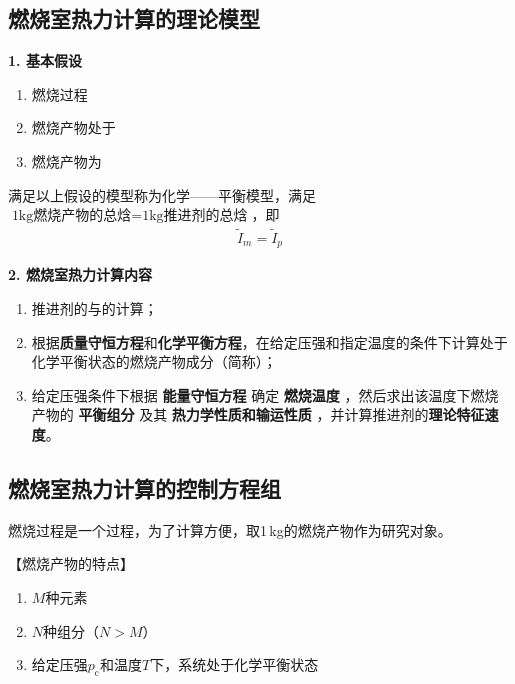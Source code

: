 \subsection{燃烧室热力计算的理论模型}

\noindent \textbf{1. 基本假设}
\begin{enumerate}[\hspace*{1.5em} (1) ]
	\item 燃烧过程\red[绝热]\vspace*{-0.5em}
	\item 燃烧产物处于\red[化学平衡状态]\vspace*{-0.5em}
	\item 燃烧产物为\red[完全气体]
\end{enumerate}

满足以上假设的模型称为化学——平衡模型，满足$\mbox{1kg燃烧产物的总焓}=\mbox{1kg推进剂的总焓}$，即
\begin{align}
	\tilde{I}_m = \tilde{I}_p
\end{align}

\noindent \textbf{2. 燃烧室热力计算内容}
\begin{enumerate}[\hspace*{1.5em} (1) ]
	\item 推进剂的\red[假定化学式]与\red[总焓]的计算；\vspace*{-0.5em}
	\item 根据\textbf{质量守恒方程}和\textbf{化学平衡方程}，在给定压强和指定温度的条件下计算处于化学平衡状态的燃烧产物成分（简称）；\vspace*{-0.5em}
	\item 给定压强条件下根据 \textbf{能量守恒方程} 确定 \textbf{燃烧温度} ，然后求出该温度下燃烧产物的 \textbf{平衡组分} 及其 \textbf{热力学性质和输运性质} ，并计算推进剂的\textbf{理论特征速度}。
\end{enumerate}

\subsection{燃烧室热力计算的控制方程组}
\sssection[燃烧室燃烧过程的基本描述]

燃烧过程是一个\red[定压燃烧]过程，为了计算方便，取1$\,$kg的燃烧产物作为研究对象。
\vspace*{0.2em}

\noindent 【燃烧产物的特点】
\vspace*{-0.5em}
\begin{enumerate}[\hspace*{1.5em} (1) ]
	\item $M$种元素\vspace*{-0.5em}
	\item $N$种组分（$N > M$）\vspace*{-0.5em}
	\item 给定压强$p_{\text{c}}$和温度$T$下，系统处于化学平衡状态
\end{enumerate}

